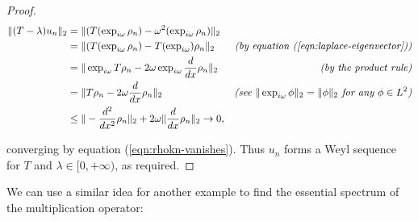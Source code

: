 \documentclass[../main.tex]{subfiles}
\begin{document}
\begin{proof}
\begin{align*}
\|(T - \lambda)u_n\|_2 & = \|(T(\exp_{i \omega} \rho_n) - \omega^2(\exp_{i \omega} \rho_n)\|_2 & \\
& = \|(T(\exp_{i \omega} \rho_n) - T(\exp_{i \omega}) \rho_n\|_2 & \text{\emph{(by equation (\ref{eqn:laplace-eigenvector}))}} \\
& =\|\exp_{i \omega} T\rho_n - 2 \omega \exp_{i \omega} \frac{d}{dx}\rho_n\|_2 & \text{\emph{(by the product rule)}} \\
& = \|T\rho_n - 2 \omega \frac{d}{dx}\rho_n\|_2 & \text{\emph{(see $\|\exp_{i \omega} \phi\|_2 = \|\phi\|_2$ for any $\phi \in L^2$)}} \\
& \leq  \|-\frac{d^2}{dx^2}\rho_n\|_2 + 2\omega\|\frac{d}{dx}\rho_n\|_2 \rightarrow 0, & 
\end{align*}

converging by equation (\ref{eqn:rhokn-vanishes}).
Thus $u_n$ forms a Weyl sequence for $T$ and $\lambda \in [0, +\infty)$, as required.
\end{proof}

We can use a similar idea for another example to find the essential spectrum of the multiplication operator:
\end{document}
